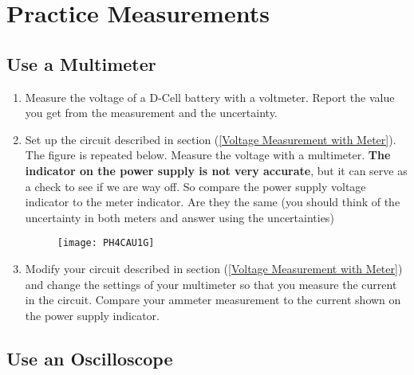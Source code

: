 \section{Practice Measurements}

\subsection{Use a Multimeter}

\begin{enumerate}
\item Measure the voltage of a D-Cell battery with a voltmeter. Report the
value you get from the measurement and the uncertainty.

\item Set up the circuit described in section (\ref{Voltage Measurement with
Meter}). The figure is repeated below. Measure the voltage with a
multimeter. \textbf{The indicator on the power supply is not very accurate},
but it can serve as a check to see if we are way off. So compare the power
supply voltage indicator to the meter indicator. Are they the same (you
should think of the uncertainty in both meters and answer using the
uncertainties)
\begin{figure}[h!]
\texttt{[image: PH4CAU1G]}
\end{figure}

\item Modify your circuit described in section (\ref{Voltage Measurement
with Meter}) and change the settings of your multimeter so that you measure
the current in the circuit. Compare your ammeter measurement to the current
shown on the power supply indicator.
\end{enumerate}

\subsection{Use an Oscilloscope}

